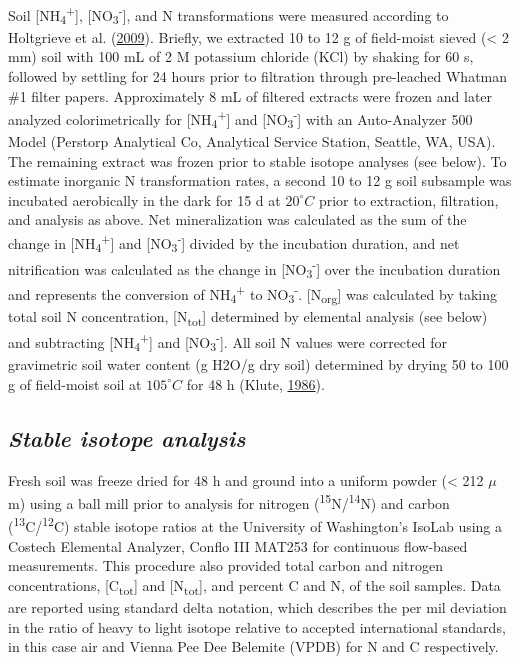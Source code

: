 \documentclass [11pt, proquest] {uwthesis}[2015/03/03]
\begin{document}
Soil {[}NH\textsubscript{4}\textsuperscript{+}{]},
{[}NO\textsubscript{3}\textsuperscript{-}{]}, and N transformations were
measured according to Holtgrieve et al.
(\protect\hyperlink{ref-Holtgrieve2009}{2009}). Briefly, we extracted 10
to 12 g of field-moist sieved (\textless{} 2 mm) soil with 100 mL of 2 M
potassium chloride (KCl) by shaking for 60 s, followed by settling for
24 hours prior to filtration through pre-leached Whatman \#1 filter
papers. Approximately 8 mL of filtered extracts were frozen and later
analyzed colorimetrically for
{[}NH\textsubscript{4}\textsuperscript{+}{]} and
{[}NO\textsubscript{3}\textsuperscript{-}{]} with an Auto-Analyzer 500
Model (Perstorp Analytical Co, Analytical Service Station, Seattle, WA,
USA). The remaining extract was frozen prior to stable isotope analyses
(see below). To estimate inorganic N transformation rates, a second 10
to 12 g soil subsample was incubated aerobically in the dark for 15 d at
\(20^{\circ}C\) prior to extraction, filtration, and analysis as above.
Net mineralization was calculated as the sum of the change in
{[}NH\textsubscript{4}\textsuperscript{+}{]} and
{[}NO\textsubscript{3}\textsuperscript{-}{]} divided by the incubation
duration, and net nitrification was calculated as the change in
{[}NO\textsubscript{3}\textsuperscript{-}{]} over the incubation
duration and represents the conversion of
NH\textsubscript{4}\textsuperscript{+} to
NO\textsubscript{3}\textsuperscript{-}. {[}N\textsubscript{org}{]} was
calculated by taking total soil N concentration,
{[}N\textsubscript{tot}{]} determined by elemental analysis (see below)
and subtracting {[}NH\textsubscript{4}\textsuperscript{+}{]} and
{[}NO\textsubscript{3}\textsuperscript{-}{]}. All soil N values were
corrected for gravimetric soil water content (g H2O/g dry soil)
determined by drying 50 to 100 g of field-moist soil at \(105^{\circ}C\)
for 48 h (Klute, \protect\hyperlink{ref-Klute1986}{1986}).

\subsection{\texorpdfstring{\emph{Stable isotope
analysis}}{Stable isotope analysis}}\label{stable-isotope-analysis}

Fresh soil was freeze dried for 48 h and ground into a uniform powder
(\textless{} 212 \(\mu\)m) using a ball mill prior to analysis for
nitrogen (\textsuperscript{15}N/\textsuperscript{14}N) and carbon
(\textsuperscript{13}C/\textsuperscript{12}C) stable isotope ratios at
the University of Washington's IsoLab using a Costech Elemental
Analyzer, Conflo III MAT253 for continuous flow-based measurements. This
procedure also provided total carbon and nitrogen concentrations,
{[}C\textsubscript{tot}{]} and {[}N\textsubscript{tot}{]}, and percent C
and N, of the soil samples. Data are reported using standard delta
notation, which describes the per mil deviation in the ratio of heavy to
light isotope relative to accepted international standards, in this case
air and Vienna Pee Dee Belemite (VPDB) for N and C respectively.
\end{document}
